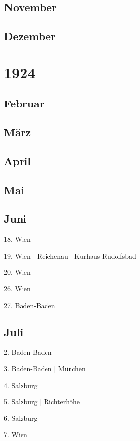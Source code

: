 \documentclass[twoside=false,titlepage=false,open=any, parskip=never, fontsize=10pt, headings=small, chapterprefix=false, appendixprefix=false, DIV=15]{scrbook}
\begin{document}
\begin{multicols}{3}
            \section*{November}
            \section*{Dezember}
            \chapter*{1924}
            \section*{Februar}
            \section*{März}
            \section*{April}
            \section*{Mai}
            \section*{Juni}
            18. Wien\par
            19. Wien | Reichenau | Kurhaus Rudolfsbad\par
            20. Wien\par
            26. Wien\par
            27. Baden-Baden\par
            \section*{Juli}
            2. Baden-Baden\par
            3. Baden-Baden | München\par
            4. Salzburg\par
            5. Salzburg | Richterhöhe\par
            6. Salzburg\par
            7. Wien\par

\end{multicols}
\end{document}
